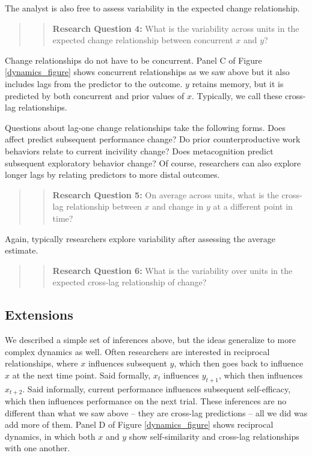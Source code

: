 \documentclass[english,,man]{apa6}
\theoremstyle{definition}
\theoremstyle{definition}
\theoremstyle{definition}
\theoremstyle{remark}
\begin{document}
The analyst is also free to assess variability in the expected change
relationship.

\begin{quote}
\begin{quote}
\textbf{Research Question 4:} What is the variability across units in
the expected change relationship between concurrent \(x\) and \(y\)?
\end{quote}
\end{quote}

Change relationships do not have to be concurrent. Panel C of Figure
\ref{dynamics_figure} shows concurrent relationships as we saw above but
it also includes lags from the predictor to the outcome. \(y\) retains
memory, but it is predicted by both concurrent and prior values of
\(x\). Typically, we call these cross-lag relationships.

Questions about lag-one change relationships take the following forms.
Does affect predict subsequent performance change? Do prior
counterproductive work behaviors relate to current incivility change?
Does metacognition predict subsequent exploratory behavior change? Of
course, researchers can also explore longer lags by relating predictors
to more distal outcomes.

\begin{quote}
\begin{quote}
\textbf{Research Question 5:} On average across units, what is the
cross-lag relationship between \(x\) and change in \(y\) at a different
point in time?
\end{quote}
\end{quote}

Again, typically researchers explore variability after assessing the
average estimate.

\begin{quote}
\begin{quote}
\textbf{Research Question 6:} What is the variability over units in the
expected cross-lag relationship of change?
\end{quote}
\end{quote}

\hypertarget{extensions}{%
\subsection{Extensions}\label{extensions}}

We described a simple set of inferences above, but the ideas generalize
to more complex dynamics as well. Often researchers are interested in
reciprocal relationships, where \(x\) influences subsequent \(y\), which
then goes back to influence \(x\) at the next time point. Said formally,
\(x_t\) influences \(y_{t+1}\), which then influences \(x_{t+2}\). Said
informally, current performance influences subsequent self-efficacy,
which then influences performance on the next trial. These inferences
are no different than what we saw above -- they are cross-lag
predictions -- all we did was add more of them. Panel D of Figure
\ref{dynamics_figure} shows reciprocal dynamics, in which both \(x\) and
\(y\) show self-similarity and cross-lag relationships with one another.
\end{document}
